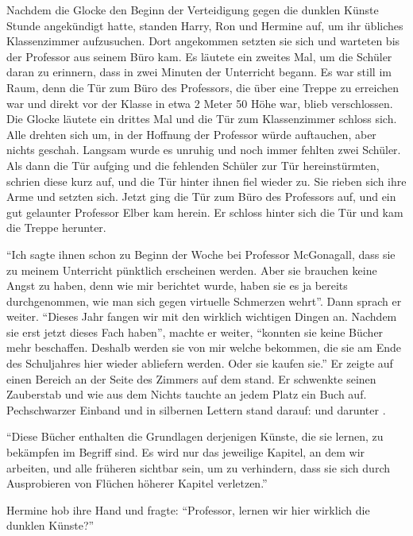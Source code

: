 \trenn

Nachdem die Glocke den Beginn der Verteidigung gegen die dunklen Künste Stunde angekündigt hatte, standen Harry, Ron und Hermine auf, um ihr übliches Klassenzimmer aufzusuchen. Dort angekommen setzten sie sich und warteten bis der Professor aus seinem Büro kam. Es läutete ein zweites Mal, um die Schüler daran zu erinnern, dass in zwei Minuten der Unterricht begann. Es war still im Raum, denn die Tür zum Büro des Professors, die über eine Treppe zu erreichen war und direkt vor der Klasse in etwa 2 Meter 50 Höhe war, blieb verschlossen. Die Glocke läutete ein drittes Mal und die Tür zum Klassenzimmer schloss sich. Alle drehten sich um, in der Hoffnung der Professor würde auftauchen, aber nichts geschah. Langsam wurde es unruhig und noch immer fehlten zwei Schüler. Als dann die Tür aufging und die fehlenden Schüler zur Tür hereinstürmten, schrien diese kurz auf, und die Tür hinter ihnen fiel wieder zu. Sie rieben sich ihre Arme und setzten sich. Jetzt ging die Tür zum Büro des Professors auf, und ein gut gelaunter Professor Elber kam herein. Er schloss hinter sich die Tür und kam die Treppe herunter.

\enquote{Ich sagte ihnen schon zu Beginn der Woche bei Professor McGonagall, dass sie zu meinem Unterricht pünktlich erscheinen werden. Aber sie brauchen keine Angst zu haben, denn wie mir berichtet wurde, haben sie es ja bereits durchgenommen, wie man sich gegen virtuelle Schmerzen wehrt}. Dann sprach er weiter. \enquote{Dieses Jahr fangen wir mit den wirklich wichtigen Dingen an. Nachdem sie erst jetzt dieses Fach haben}, machte er weiter, \enquote{konnten sie keine Bücher mehr beschaffen. Deshalb werden sie von mir welche bekommen, die sie am Ende des Schuljahres hier wieder abliefern werden. Oder sie kaufen sie.} Er zeigte auf einen Bereich an der Seite des Zimmers auf dem  stand. Er schwenkte seinen Zauberstab und wie aus dem Nichts tauchte an jedem Platz ein Buch auf. Pechschwarzer Einband und in silbernen Lettern stand darauf:  und darunter .

\enquote{Diese Bücher enthalten die Grundlagen derjenigen Künste, die sie lernen, zu bekämpfen im Begriff sind. Es wird nur das jeweilige Kapitel, an dem wir arbeiten, und alle früheren sichtbar sein, um zu verhindern, dass sie sich durch Ausprobieren von Flüchen höherer Kapitel verletzen.}

Hermine hob ihre Hand und fragte: \enquote{Professor, lernen wir hier wirklich die dunklen Künste?}

